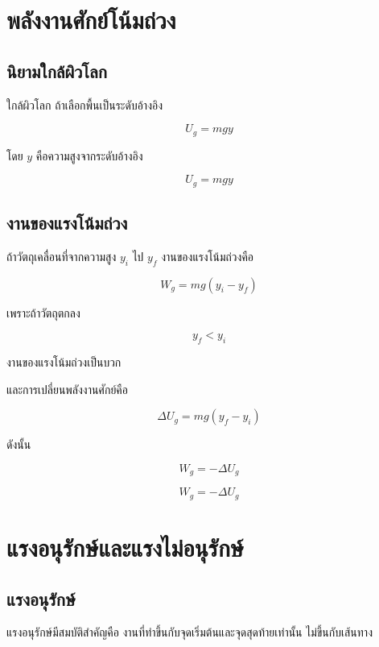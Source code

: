 \section{พลังงานศักย์โน้มถ่วง}

\subsection{นิยามใกล้ผิวโลก}

ใกล้ผิวโลก ถ้าเลือกพื้นเป็นระดับอ้างอิง

\[
U_g=mgy
\]

โดย $y$ คือความสูงจากระดับอ้างอิง

\begin{tcolorbox}[title=พลังงานศักย์โน้มถ่วงใกล้ผิวโลก]
\[
U_g=mgy
\]
\end{tcolorbox}

\subsection{งานของแรงโน้มถ่วง}

ถ้าวัตถุเคลื่อนที่จากความสูง $y_i$ ไป $y_f$ งานของแรงโน้มถ่วงคือ

\[
W_g=mg(y_i-y_f)
\]

เพราะถ้าวัตถุตกลง

\[
y_f<y_i
\]

งานของแรงโน้มถ่วงเป็นบวก

และการเปลี่ยนพลังงานศักย์คือ

\[
\Delta U_g=mg(y_f-y_i)
\]

ดังนั้น

\[
W_g=-\Delta U_g
\]

\begin{tcolorbox}[title=ความสัมพันธ์ระหว่างงานของแรงโน้มถ่วงกับพลังงานศักย์]
\[
W_g=-\Delta U_g
\]
\end{tcolorbox}

\section{แรงอนุรักษ์และแรงไม่อนุรักษ์}

\subsection{แรงอนุรักษ์}

แรงอนุรักษ์มีสมบัติสำคัญคือ งานที่ทำขึ้นกับจุดเริ่มต้นและจุดสุดท้ายเท่านั้น ไม่ขึ้นกับเส้นทาง

